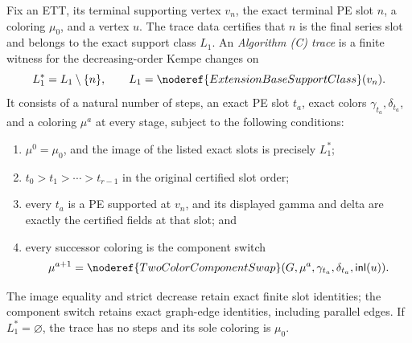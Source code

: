 \begin{definition}
Fix an ETT, its terminal supporting vertex \(v_n\), the exact terminal
PE slot \(n\), a coloring \(\mu_0\), and a vertex \(u\).  The trace data
certifies that \(n\) is the final series slot and belongs to the exact
support class \(L_1\).  An
\emph{Algorithm (C) trace} is a finite witness for the decreasing-order
Kempe changes on
\[
 L_1^*=L_1\setminus\{n\},\qquad
 L_1=\noderef{ExtensionBaseSupportClass}(v_n).
\]
It consists of a natural number of steps, an exact PE slot \(t_a\), exact
colors \(\gamma_{t_a},\delta_{t_a}\), and a coloring \(\mu^a\) at every
stage, subject to the following conditions:
\begin{enumerate}
\item \(\mu^0=\mu_0\), and the image of the listed exact slots is
      precisely \(L_1^*\);
\item \(t_0>t_1>\cdots>t_{r-1}\) in the original certified slot order;
\item every \(t_a\) is a PE supported at \(v_n\), and its displayed gamma
      and delta are exactly the certified fields at that slot; and
\item every successor coloring is the component switch
\[
 \mu^{a+1}=\noderef{TwoColorComponentSwap}
   (G,\mu^a,\gamma_{t_a},\delta_{t_a},\mathsf{inl}(u)).
\]
\end{enumerate}
The image equality and strict decrease retain exact finite slot identities;
the component switch retains exact graph-edge identities, including
parallel edges.  If \(L_1^*=\varnothing\), the trace has no steps and its
sole coloring is \(\mu_0\).
\end{definition}
